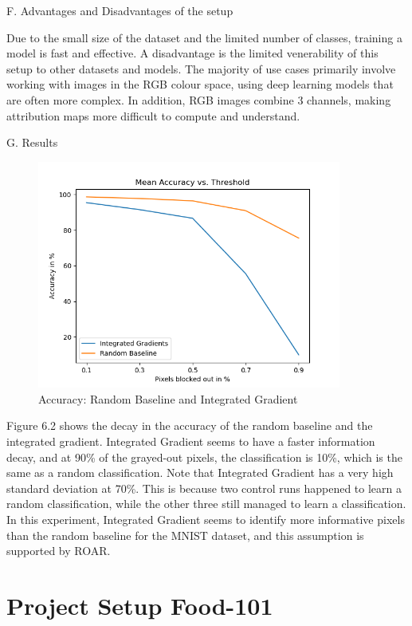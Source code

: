 F. Advantages and Disadvantages of the setup

Due to the small size of the dataset and the limited number of classes, training a model is fast and effective. A disadvantage is the limited venerability of this setup to other datasets and models. The majority of use cases primarily involve working with images in the RGB colour space, using deep learning models that are often more complex. In addition, RGB images combine 3 channels, making attribution maps more difficult to compute and understand.

G. Results

\begin{figure}[H]
	\centering
	\includegraphics[width=100mm]{figs/mean_accuracy_vs_threshold}
	\caption{Accuracy: Random Baseline and Integrated Gradient}
	\label{fig:Accuracy}
	
\end{figure}

Figure 6.2 shows the decay in the accuracy of the random baseline and the integrated gradient. Integrated Gradient seems to have a faster information decay, and at 90\% of the grayed-out pixels, the classification is 10\%, which is the same as a random classification. Note that Integrated Gradient has a very high standard deviation at 70\%. This is because two control runs happened to learn a random classification, while the other three still managed to learn a classification. In this experiment, Integrated Gradient seems to identify more informative pixels than the random baseline for the MNIST dataset, and this assumption is supported by ROAR.

\section{Project Setup Food-101}

